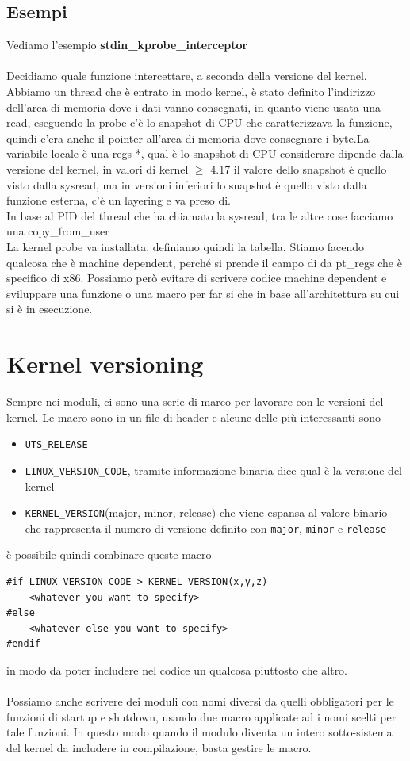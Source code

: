 \documentclass[12pt, oneside]{extbook}
\begin{document}
\subsection*{Esempi}
Vediamo l'esempio \textbf{stdin\_kprobe\_interceptor}\\\\Decidiamo quale funzione intercettare, a seconda della versione del kernel.\\Abbiamo un thread che è entrato in modo kernel, è stato definito l'indirizzo dell'area di memoria dove i dati vanno consegnati, in quanto viene usata una read, eseguendo la probe c'è lo snapshot di CPU che caratterizzava la funzione, quindi c'era anche il pointer all'area di memoria dove consegnare i byte.La variabile locale è una regs *, qual è lo snapshot di CPU considerare dipende dalla versione del kernel, in valori di kernel $\geq$ 4.17 il valore dello snapshot è quello visto dalla sysread, ma in versioni inferiori lo snapshot è quello visto dalla funzione esterna, c'è un layering e va preso di.\\In base al PID del thread che ha chiamato la sysread, tra le altre cose facciamo una copy\_from\_user\\La kernel probe va installata, definiamo quindi la tabella. Stiamo facendo qualcosa che è machine dependent, perché si prende il campo di da pt\_regs che è specifico di x86. Possiamo però evitare di scrivere codice machine dependent e sviluppare una funzione o una macro per far si che in base all'architettura su cui si è in esecuzione.
\section{Kernel versioning}
Sempre nei moduli, ci sono una serie di marco per lavorare con le versioni del kernel. Le macro sono in un file di header e alcune delle più interessanti sono 
\begin{itemize}
\item \texttt{UTS\_RELEASE}
\item \texttt{LINUX\_VERSION\_CODE}, tramite informazione binaria dice qual è la versione del kernel
\item \texttt{KERNEL\_VERSION}(major, minor, release) che viene espansa al valore binario che rappresenta il numero di versione definito con \texttt{major}, \texttt{minor} e \texttt{release}
\end{itemize}
è possibile quindi combinare queste macro
\begin{lstlisting}
#if LINUX_VERSION_CODE > KERNEL_VERSION(x,y,z)
	<whatever you want to specify>
#else
	<whatever else you want to specify>
#endif
\end{lstlisting}
in modo da poter includere nel codice un qualcosa piuttosto che altro.\\\\Possiamo anche scrivere dei moduli con nomi diversi da quelli obbligatori per le funzioni di startup e shutdown, usando due macro applicate ad i nomi scelti per tale funzioni. In questo modo quando il modulo diventa un intero sotto-sistema del kernel da includere in compilazione, basta gestire le macro.
\end{document}
